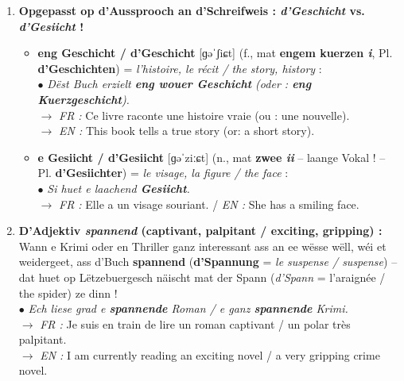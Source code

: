 \begin{enumerate}
    \item \textbf{Opgepasst op d'Aussprooch an d'Schreifweis : \textit{d'Geschicht} vs. \textit{d'Gesiicht} !}
    \begin{itemize}
        \item \textbf{eng Geschicht / d'Geschicht} {[ɡəˈʃiɕt]} (f., mat \textbf{engem kuerzen \textit{i}}, Pl. \textbf{d'Geschichten}) = \textit{l'histoire, le récit / the story, history} : \\
        $\bullet$ \textit{Dëst Buch erzielt \textbf{eng wouer Geschicht} (oder : \textbf{eng Kuerzgeschicht}).} \\
        $\rightarrow$ \textit{FR :} Ce livre raconte une histoire vraie (ou : une nouvelle). \\
        $\rightarrow$ \textit{EN :} This book tells a true story (or: a short story).
        \item \textbf{e Gesiicht / d'Gesiicht} {[ɡəˈziːɕt]} (n., mat \textbf{zwee \textit{ii}} -- laange Vokal ! -- Pl. \textbf{d'Gesiichter}) = \textit{le visage, la figure / the face} : \\
        $\bullet$ \textit{Si huet e laachend \textbf{Gesiicht}.} \\
        $\rightarrow$ \textit{FR :} Elle a un visage souriant. / \textit{EN :} She has a smiling face.
    \end{itemize}

    \vspace{0.3em}

    \item \textbf{D'Adjektiv \textit{spannend} (captivant, palpitant / exciting, gripping) :} \\
    Wann e Krimi oder en Thriller ganz interessant ass an ee wësse wëll, wéi et weidergeet, ass d'Buch \textbf{spannend} (\textbf{d'Spannung} = \textit{le suspense / suspense}) -- dat huet op Lëtzebuergesch näischt mat der Spann (\textit{d'Spann} = l'araignée / the spider) ze dinn ! \\
    $\bullet$ \textit{Ech liese grad e \textbf{spannende} Roman / e ganz \textbf{spannende} Krimi.} \\
    $\rightarrow$ \textit{FR :} Je suis en train de lire un roman captivant / un polar très palpitant. \\
    $\rightarrow$ \textit{EN :} I am currently reading an exciting novel / a very gripping crime novel.

    \vspace{0.3em}


\end{enumerate}
